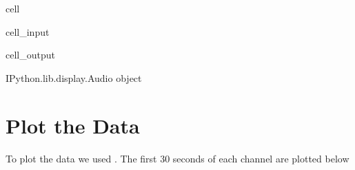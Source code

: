 \documentclass[letterpaper,10pt,english]{jupyterBook}
\begin{document}
\begin{sphinxuseclass}{cell}\begin{sphinxVerbatimInput}

\begin{sphinxuseclass}{cell_input}
\begin{sphinxVerbatim}[commandchars=\\\{\}]
  
  \PYG{p}{[}\PYG{p}{]}
    
    
  
  \PYG{p}{[}\PYG{p}{]}
  \PYG{p}{[}\PYG{p}{]}\PYG{p}{[}\PYG{p}{]}
  \PYG{p}{[}\PYG{p}{]}\PYG{p}{[}\PYG{p}{]}
  \PYG{p}{[} \PYG{p}{]}
 
\end{sphinxVerbatim}

\end{sphinxuseclass}\end{sphinxVerbatimInput}
\begin{sphinxVerbatimOutput}

\begin{sphinxuseclass}{cell_output}
\begin{sphinxVerbatim}[commandchars=\\\{\}]
\PYGZlt{}IPython.lib.display.Audio object\PYGZgt{}
\end{sphinxVerbatim}

\end{sphinxuseclass}\end{sphinxVerbatimOutput}

\end{sphinxuseclass}

\section{Plot the Data}
\label{\detokenize{content/0_project_part2:plot-the-data}}
\sphinxAtStartPar
To plot the data we used . The first 30 seconds of each channel are plotted below
\end{document}
